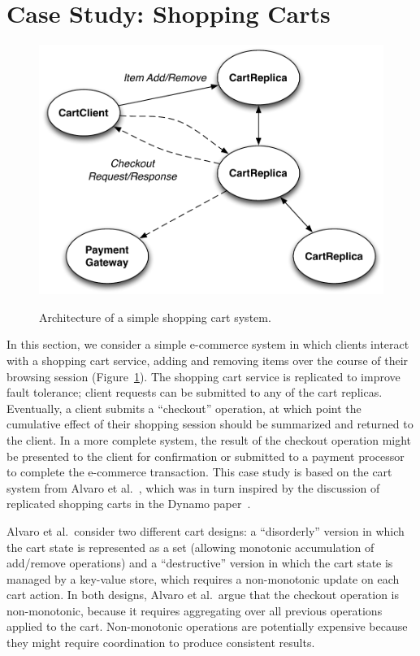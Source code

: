 \section{Case Study: Shopping Carts}
\label{sec:carts}

\begin{figure}
\includegraphics[width=\linewidth]{fig/cart_arch.pdf}
\label{fig:cart-system}
\caption{Architecture of a simple shopping cart system.}
\end{figure}

In this section, we consider a simple e-commerce system in which clients
interact with a shopping cart service, adding and removing items over the course
of their browsing session (Figure~\ref{fig:cart-system}). The shopping cart
service is replicated to improve fault tolerance; client requests can be
submitted to any of the cart replicas. Eventually, a client submits a
``checkout'' operation, at which point the cumulative effect of their shopping
session should be summarized and returned to the client. In a more complete
system, the result of the checkout operation might be presented to the client
for confirmation or submitted to a payment processor to complete the e-commerce
transaction. This case study is based on the cart system from Alvaro et
al.~\cite{Alvaro2011}, which was in turn inspired by the discussion of
replicated shopping carts in the Dynamo paper~\cite{DeCandia2007}.

Alvaro et al.\ consider two different cart designs: a ``disorderly'' version in
which the cart state is represented as a set (allowing monotonic accumulation of
add/remove operations) and a ``destructive'' version in which the cart state is
managed by a key-value store, which requires a non-monotonic update on each cart
action. In both designs, Alvaro et al.\ argue that the checkout operation is
non-monotonic, because it requires aggregating over all previous operations
applied to the cart. Non-monotonic operations are potentially expensive because
they might require coordination to produce consistent results.

